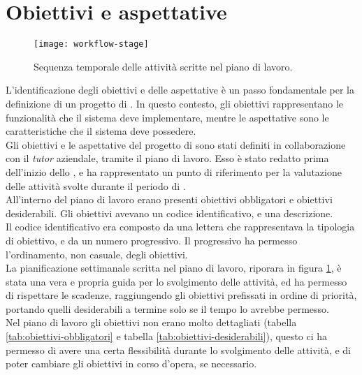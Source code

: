 \section{Obiettivi e aspettative}

\begin{figure}[!h] 
  \centering 
  \texttt{[image: workflow-stage]} 
  \caption{Sequenza temporale delle attività scritte nel piano di lavoro.}
  \label{fig:workflow-stage}
\end{figure}

L'identificazione degli obiettivi e delle aspettative è un passo fondamentale per la definizione di un progetto di \stage.
In questo contesto, gli obiettivi rappresentano le funzionalità che il sistema deve implementare, mentre le aspettative
sono le caratteristiche che il sistema deve possedere.\\
Gli obiettivi e le aspettative del progetto di \stage{} sono stati definiti in collaborazione con il \textit{tutor} aziendale, 
tramite il piano di lavoro.
Esso è stato redatto prima dell'inizio dello \stage, e ha rappresentato un punto di riferimento per la valutazione
delle attività svolte durante il periodo di \stage.\\
All'interno del piano di lavoro erano presenti obiettivi obbligatori e obiettivi desiderabili.
Gli obiettivi avevano un codice identificativo, e una descrizione.\\ 
Il codice identificativo era composto da una lettera che rappresentava la tipologia di obiettivo, e da un numero progressivo.
Il progressivo ha permesso l'ordinamento, non casuale, degli obiettivi. \\
La pianificazione settimanale scritta nel piano di lavoro, riporara in figura \ref*{fig:workflow-stage}, è stata una vera e propria 
guida per lo svolgimento delle attività, ed 
ha permesso di rispettare le scadenze, raggiungendo gli obiettivi prefissati in ordine di priorità, portando quelli desiderabili
a termine solo se il tempo lo avrebbe permesso.\\

Nel piano di lavoro gli obiettivi non erano molto dettagliati (tabella \ref*{tab:obiettivi-obbligatori} e tabella \ref*{tab:obiettivi-desiderabili}), questo ci ha permesso di avere una certa flessibilità durante lo svolgimento
delle attività, e di poter cambiare gli obiettivi in corso d'opera, se necessario.\\

